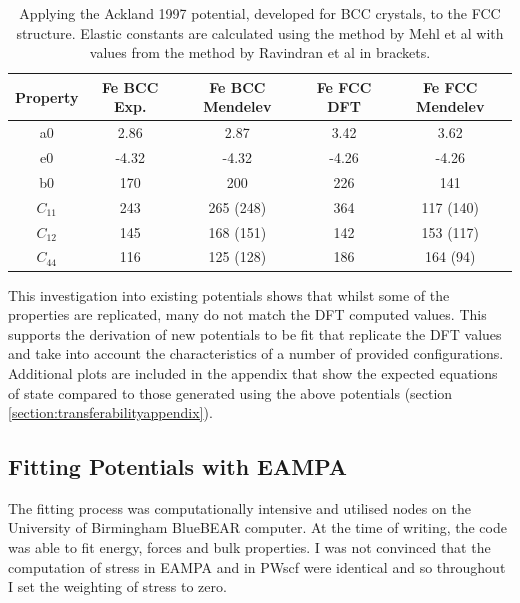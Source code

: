\begin{table}[h]
\begin{center}
\begin{tabular}{c c c c c}
\hline\hline
Property   & Fe BCC Exp. & Fe BCC Mendelev &  Fe FCC DFT & Fe FCC Mendelev \\
\hline\hline
a0             &   2.86  &   2.87       &   3.42   &   3.62          \\
e0             &  -4.32  &  -4.32       &  -4.26   &  -4.26          \\
b0             &   170   &   200        &   226    &   141           \\
$C_{11}$       &   243   &   265 (248)  &   364    &   117 (140)     \\
$C_{12}$       &   145   &   168 (151)  &   142    &   153 (117)     \\
$C_{44}$       &   116   &   125 (128)  &   186    &   164 (94)      \\
\hline\hline
\end{tabular}
\end{center}
\caption{Applying the Ackland 1997 potential, developed for BCC crystals, to the FCC structure.  Elastic constants are calculated using the method by Mehl et al with values from the method by Ravindran et al in brackets.}
\label{table:feacklandtransferability}
\end{table}

This investigation into existing potentials shows that whilst some of the properties are replicated, many do not match the DFT computed values.  This supports the derivation of new potentials to be fit that replicate the DFT values and take into account the characteristics of a number of provided configurations.  Additional plots are included in the appendix that show the expected equations of state compared to those generated using the above potentials (section \ref{section:transferabilityappendix}).







\subsection{Fitting Potentials with EAMPA}

The fitting process was computationally intensive and utilised nodes on the University of Birmingham BlueBEAR computer.  At the time of writing, the code was able to fit energy, forces and bulk properties.  I was not convinced that the computation of stress in EAMPA and in PWscf were identical and so throughout I set the weighting of stress to zero.

